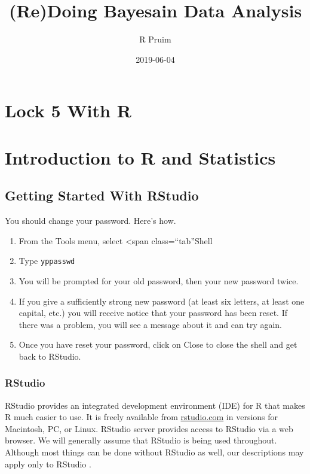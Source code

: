 \documentclass[]{book}
\title{(Re)Doing Bayesain Data Analysis}
\author{R Pruim}
\date{2019-06-04}
\providecommand{\tightlist}{%
  \setlength{\itemsep}{0pt}\setlength{\parskip}{0pt}}
\begin{document}
\maketitle

{
\setcounter{tocdepth}{1}
\tableofcontents
}
\hypertarget{lock-5-with-r}{%
\chapter*{Lock 5 With R}\label{lock-5-with-r}}

\newpage

\hypertarget{introduction-to-r-and-statistics}{%
\chapter*{Introduction to R and Statistics}\label{introduction-to-r-and-statistics}}

\hypertarget{getting-started-with-rstudio}{%
\section{Getting Started With RStudio}\label{getting-started-with-rstudio}}

You should change your password. Here's how.

\begin{enumerate}
\tightlist
\item
  From the {Tools} menu, select \textless span class=``tab''Shell
\item
  Type \texttt{yppasswd}
\item
  You will be prompted for your old password, then your new password twice.
\item
  If you give a sufficiently strong new password (at least six letters, at least one capital, etc.) you will receive notice that your password has been reset. If there was a problem, you will see a message about it and can try again.
\item
  Once you have reset your password, click on {Close} to close the shell and get back to RStudio.
\end{enumerate}

\hypertarget{rstudio}{%
\subsection{RStudio}\label{rstudio}}

RStudio provides an integrated development environment (IDE) for R that makes R much easier to use.
It is freely available from \href{http://rstudio.com}{rstudio.com} in versions for Macintosh, PC, or Linux.
RStudio server provides access to RStudio via a web browser. We will generally assume that RStudio
is being used throughout. Although most things can be done without RStudio as well, our descriptions
may apply only to RStudio .
\end{document}
